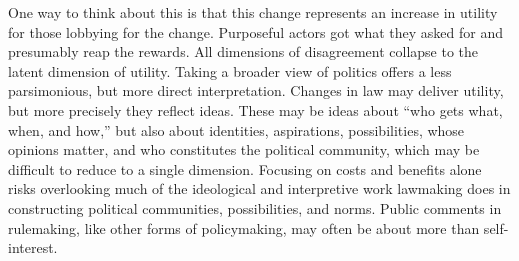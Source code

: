 One way to think about this is that this change represents an increase in utility for those lobbying for the change. Purposeful actors got what they asked for and presumably reap the rewards. All dimensions of disagreement collapse to the latent dimension of utility. %
Taking a broader view of politics offers a less parsimonious, but more direct interpretation. Changes in law may deliver utility, but more precisely they reflect ideas. These may be ideas about ``who gets what, when, and how,'' but also about identities, aspirations, possibilities, whose opinions matter, and who constitutes the political community, which may be difficult to reduce to a single dimension. Focusing on costs and benefits alone risks overlooking much of the ideological and interpretive work lawmaking does in constructing political communities, possibilities, and norms. Public comments in rulemaking, like other forms of policymaking, may often be about more than self-interest. 




